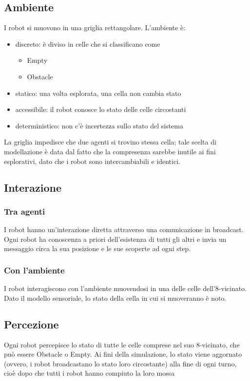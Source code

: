 \subsection{Ambiente}
	I robot si muovono in una griglia rettangolare. L'ambiente è:
	\begin{itemize}
		\item discreto: è diviso in celle che si classificano come
		\begin{itemize}
			\item Empty
			\item Obstacle
		\end{itemize}
		\item statico: una volta esplorata, una cella non cambia stato
		\item accessibile: il robot conosce lo stato delle celle circostanti
		\item deterministico: non c'è incertezza sullo stato del sistema
	\end{itemize}
	La griglia impedisce che due agenti si trovino stessa cella; tale scelta
	di modellazione è data dal fatto che la compresenza sarebbe inutile ai fini
	esplorativi, dato che i robot sono intercambiabili e identici.
\subsection{Interazione}
  \subsubsection{Tra agenti}
    I robot hanno un'interazione diretta attraverso una comunicazione in
    broadcast.
	Ogni robot ha conoscenza a priori dell'esistenza di tutti gli altri e invia
	un messaggio circa la sua posizione e le sue scoperte ad ogni step.
  \subsubsection{Con l'ambiente}
    I robot interagiscono con l'ambiente muovendosi in una delle celle
    dell'8-vicinato.
    Dato il modello sensoriale, lo stato della cella in cui si muoveranno è
    noto.
\subsection{Percezione}
  Ogni robot percepisce lo stato di tutte le celle comprese nel suo 8-vicinato,
  che può essere Obstacle o Empty.
  Ai fini della simulazione, lo stato viene aggornato (ovvero, i robot
  broadcastano lo stato loro circostante) alla fine di ogni turno, cioè dopo che
  tutti i robot hanno compiuto la loro mossa
